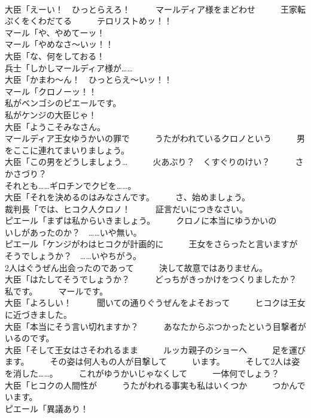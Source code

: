 \documentclass[8pt]{extreport}
\begin{document}
\begin{CJK}{UTF8}{min}
\\	大臣「えーい！　ひっとらえろ！　　　マールディア様をまどわせ　　　王家転ぷくをくわだてる　　　テロリストめッ！！	
\\	マール「や、やめてーッ！	
\\	マール「やめなさ～いッ！！	
\\	大臣「な、何をしておる！	
\\	兵士「しかしマールディア様が……	
\\	大臣「かまわ～ん！　ひっとらえ～いッ！！	
\\	マール「クロノーッ！！	
\\	私がベンゴシのピエールです。	
\\	私がケンジの大臣じゃ！	
\\	大臣「ようこそみなさん。	
\\	マールディア王女ゆうかいの罪で　　　うたがわれているクロノという　　　男をここに連れてまいりましょう。	
\\	大臣「この男をどうしましょう…　　　火あぶり？　くすぐりのけい？　　　さかさづり？	
\\	それとも……ギロチンでクビを……。	
\\	大臣「それを決めるのはみなさんです。　　　さ、始めましょう。	
\\	裁判長「では、ヒコク人クロノ！　　　証言だいにつきなさい。	
\\	ピエール「まずは私からいきましょう。　　　クロノに本当にゆうかいの　　　いしがあったのか？　……いや無い。	
\\	ピエール「ケンジがわはヒコクが計画的に　　　王女をさらったと言いますが　　　そうでしょうか？　……いやちがう。	
\\	2人はぐうぜん出会ったのであって　　　決して故意ではありません。	
\\	大臣「はたしてそうでしょうか？　　　どっちがきっかけをつくりましたか？　　　私です。　　　マールです。	
\\	大臣「よろしい！　　　聞いての通りぐうぜんをよそおって　　　ヒコクは王女に近づきました。	
\\	大臣「本当にそう言い切れますか？　　　あなたからぶつかったという目撃者が　　　いるのです。	
\\	大臣「そして王女はさそわれるまま　　　ルッカ親子のショーへ　　　足を運びます。　　　その姿は何人もの人が目撃して　　　います。　　　そして2人は姿を消した……。　　　これがゆうかいじゃなくして　　　一体何でしょう？	
\\	大臣「ヒコクの人間性が　　　うたがわれる事実も私はいくつか　　　つかんでいます。	
\\	ピエール「異議あり！	

\end{CJK}
\end{document}
